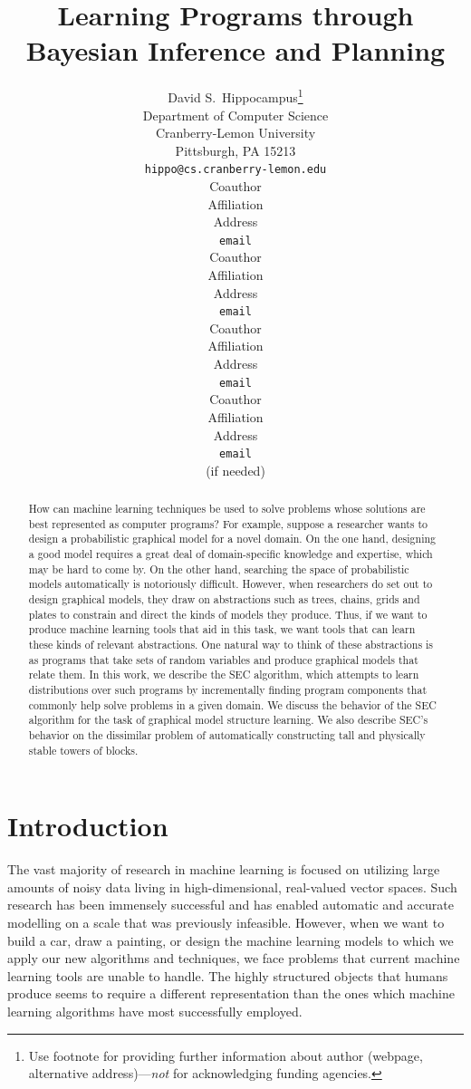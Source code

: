 \documentclass{article} %
\title{Learning Programs through Bayesian Inference and Planning}
\author{
David S.~Hippocampus\thanks{ Use footnote for providing further information
about author (webpage, alternative address)---\emph{not} for acknowledging
funding agencies.} \\
Department of Computer Science\\
Cranberry-Lemon University\\
Pittsburgh, PA 15213 \\
\texttt{hippo@cs.cranberry-lemon.edu} \\
\And
Coauthor \\
Affiliation \\
Address \\
\texttt{email} \\
\AND
Coauthor \\
Affiliation \\
Address \\
\texttt{email} \\
\And
Coauthor \\
Affiliation \\
Address \\
\texttt{email} \\
\And
Coauthor \\
Affiliation \\
Address \\
\texttt{email} \\
(if needed)\\
}
\begin{document}
\maketitle

\begin{abstract}
How can machine learning techniques be used to solve problems whose solutions are best represented as computer programs? For example, suppose a researcher wants to design a probabilistic graphical model for a novel domain. On the one hand, designing a good model requires a great deal of domain-specific knowledge and expertise, which may be hard to come by. On the other hand, searching the space of probabilistic models automatically is notoriously difficult. However, when researchers do set out to design graphical models, they draw on abstractions such as trees, chains, grids and plates to constrain and direct the kinds of models they produce. Thus, if we want to produce machine learning tools that aid in this task, we want tools that can learn these kinds of relevant abstractions. One natural way to think of these abstractions is as programs that take sets of random variables and produce graphical models that relate them. In this work, we describe the SEC algorithm, which attempts to learn distributions over such programs by incrementally finding program components that commonly help solve problems in a given domain. We discuss the behavior of the SEC algorithm for the task of graphical model structure learning. We also describe SEC's behavior on the dissimilar problem of automatically constructing tall and physically stable towers of blocks. 
\end{abstract}

\section{Introduction}

The vast majority of research in machine learning is focused on utilizing large amounts of noisy data living in high-dimensional, real-valued vector spaces. Such research has been immensely successful and has enabled automatic and accurate modelling on a scale that was previously infeasible. However, when we want to build a car, draw a painting, or design the machine learning models to which we apply our new algorithms and techniques, we face problems that current machine learning tools are unable to handle. The highly structured objects that humans produce seems to require a different representation than the ones which machine learning algorithms have most successfully employed. 
\end{document}
